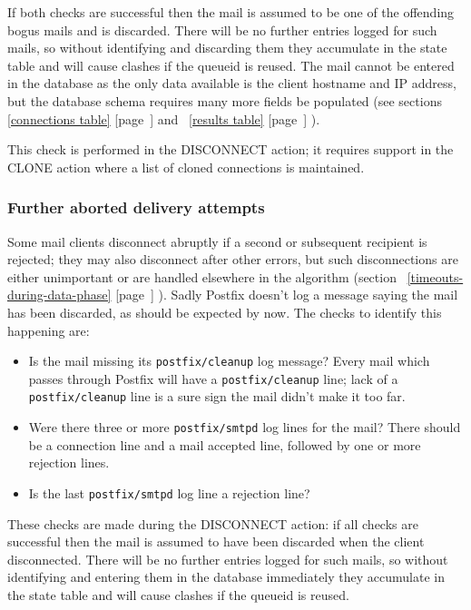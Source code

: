 \documentclass[a4paper,12pt,draft]{article}
\newcommand{\refwithpage}[1]{%
    \empty{}\ref{#1} [page~\pageref{#1}]%
}
\newcommand{\daemon}[1]{%
    \texttt{postfix/#1}%
}
\begin{document}
If both checks are successful then the mail is assumed to be one of the
offending bogus mails and is discarded.  There will be no further entries
logged for such mails, so without identifying and discarding them they
accumulate in the state table and will cause clashes if the queueid is
reused.  The mail cannot be entered in the database as the only data
available is the client hostname and IP address, but the database schema
requires many more fields be populated (see
sections~\refwithpage{connections table} and~\refwithpage{results table}).

This check is performed in the DISCONNECT action; it requires support in
the CLONE action where a list of cloned connections is maintained.

\subsubsection{Further aborted delivery attempts}

Some mail clients disconnect abruptly if a second or subsequent recipient
is rejected; they may also disconnect after other errors, but such
disconnections are either unimportant or are handled elsewhere in the
algorithm (section~\refwithpage{timeouts-during-data-phase}).  Sadly
Postfix doesn't log a message saying the mail has been discarded, as should
be expected by now.  The checks to identify this happening are:

\begin{itemize}

    \item Is the mail missing its \daemon{cleanup} log message?  Every mail
        which passes through Postfix will have a \daemon{cleanup} line;
        lack of a \daemon{cleanup} line is a sure sign the mail didn't make
        it too far.

    \item Were there three or more \daemon{smtpd} log lines for the mail?
        There should be a connection line and a mail accepted line,
        followed by one or more rejection lines.

    \item Is the last \daemon{smtpd} log line a rejection line?

\end{itemize}

These checks are made during the DISCONNECT action: if all checks are
successful then the mail is assumed to have been discarded when the client
disconnected.  There will be no further entries logged for such mails, so
without identifying and entering them in the database immediately they
accumulate in the state table and will cause clashes if the queueid is
reused.
\end{document}
